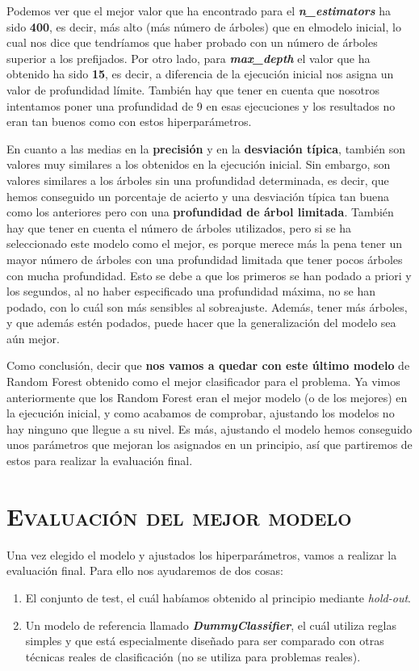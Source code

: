 \documentclass[11pt,a4paper]{article}
\begin{document}
Podemos ver que el mejor valor que ha encontrado para el \textit{\textbf{n\_estimators}} ha sido \textbf{400}, es decir, más alto 
(más número de árboles) que en elmodelo inicial, lo cual nos dice que tendríamos que haber probado con un número de árboles superior a los 
prefijados. Por otro lado, para \textit{\textbf{max\_depth}} el valor que ha obtenido ha sido \textbf{15}, es decir, a diferencia de la ejecución inicial nos asigna 
un valor de profundidad límite. También hay que tener en cuenta que nosotros intentamos poner una profundidad de 9 en esas ejecuciones y 
los resultados no eran tan buenos como con estos hiperparámetros.

En cuanto a las medias en la \textbf{precisión} y en la \textbf{desviación típica}, también son valores muy similares a los obtenidos en la ejecución
inicial. Sin embargo, son valores similares a los árboles sin una profundidad determinada, es decir, que hemos conseguido un porcentaje de
acierto y una desviación típica tan buena como los anteriores pero con una \textbf{profundidad de árbol limitada}. También hay que tener en cuenta
el número de árboles utilizados, pero si se ha seleccionado este modelo como el mejor, es porque merece más la pena tener un mayor número
de árboles con una profundidad limitada que tener pocos árboles con mucha profundidad. Esto se debe a que los primeros se han podado a
priori y los segundos, al no haber especificado una profundidad máxima, no se han podado, con lo cuál son más sensibles al sobreajuste.
Además, tener más árboles, y que además estén podados, puede hacer que la generalización del modelo sea aún mejor.

Como conclusión, decir que \textbf{nos vamos a quedar con este último modelo} de Random Forest obtenido como el mejor clasificador para el problema.
Ya vimos anteriormente que los Random Forest eran el mejor modelo (o de los mejores) en la ejecución inicial, y como acabamos de comprobar,
ajustando los modelos no hay ninguno que llegue a su nivel. Es más, ajustando el modelo hemos conseguido unos parámetros que mejoran los
asignados en un principio, así que partiremos de estos para realizar la evaluación final.

\section{\textsc{Evaluación del mejor modelo}}

Una vez elegido el modelo y ajustados los hiperparámetros, vamos a realizar la evaluación final. Para ello nos ayudaremos de dos cosas: 
\begin{enumerate}
    \item El conjunto de test, el cuál habíamos obtenido al principio mediante \textit{hold-out}.
    \item Un modelo de referencia llamado \textbf{\textit{DummyClassifier}}\cite{DummyClassifier}, el cuál utiliza reglas simples y que está
    especialmente diseñado para ser comparado con otras técnicas reales de clasificación (no se utiliza para problemas reales).
\end{enumerate}
\end{document}
